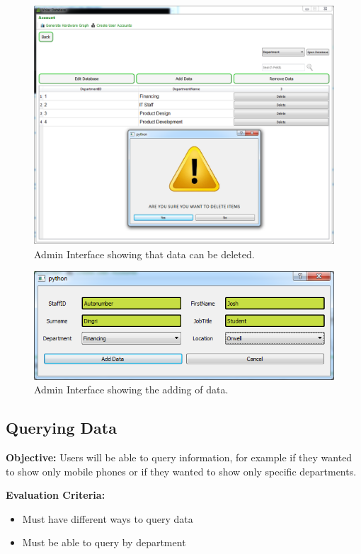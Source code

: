 \begin{figure}[H]
    \includegraphics[width=\textwidth]{./Evaluation/Images/admin3.png}
    \caption{Admin Interface showing that data can be deleted.} 
\end{figure}

\begin{figure}[H]
    \includegraphics[width=\textwidth]{./Testing/Images/AddDataDataExample.png}
    \caption{Admin Interface showing the adding of data.} 
\end{figure}

\subsection{Querying Data}\label{queryf}

\textbf{Objective:} Users will be able to query information, for example if they wanted to show only mobile phones or if they wanted to show only specific departments.

\textbf{Evaluation Criteria:}
\begin{itemize}
\item{Must have different ways to query data}
\item{Must be able to query by department}
\end{itemize}

